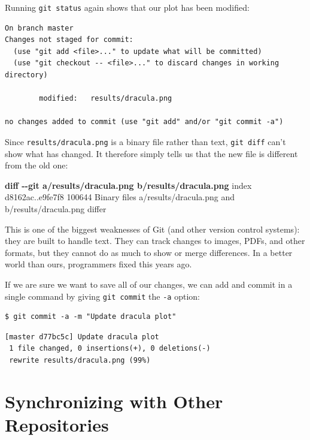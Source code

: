 \documentclass[
]{krantz}
\makeatletter
\newenvironment{Shaded}{\begin{snugshade}}{\end{snugshade}}
\newcommand{\KeywordTok}[1]{\textcolor[rgb]{0.13,0.29,0.53}{\textbf{#1}}}
\newcommand{\NormalTok}[1]{#1}
\newenvironment{kframe}{%
\medskip{}
\setlength{\fboxsep}{.8em}
 \def\at@end@of@kframe{}%
 \ifinner\ifhmode%
  \def\at@end@of@kframe{\end{minipage}}%
  \begin{minipage}{\columnwidth}%
 \fi\fi%
 \def\FrameCommand##1{\hskip\@totalleftmargin \hskip-\fboxsep
 \colorbox{shadecolor}{##1}\hskip-\fboxsep
     \hskip-\linewidth \hskip-\@totalleftmargin \hskip\columnwidth}%
 \MakeFramed {\advance\hsize-\width
   \@totalleftmargin\z@ \linewidth\hsize
   \@setminipage}}%
 {\par\unskip\endMakeFramed%
 \at@end@of@kframe}
\renewenvironment{Shaded}{\begin{kframe}}{\end{kframe}}
\makeatother
\begin{document}
Running \texttt{git\ status} again shows that our plot has been modified:

\begin{verbatim}
On branch master
Changes not staged for commit:
  (use "git add <file>..." to update what will be committed)
  (use "git checkout -- <file>..." to discard changes in working directory)

        modified:   results/dracula.png

no changes added to commit (use "git add" and/or "git commit -a")
\end{verbatim}

Since \texttt{results/dracula.png} is a binary file rather than text,
\texttt{git\ diff} can't show what has changed.
It therefore simply tells us that the new file is different from the old one:

\begin{Shaded}
\begin{Highlighting}[]
\KeywordTok{diff {-}{-}git a/results/dracula.png b/results/dracula.png}
\NormalTok{index d8162ac..e9fe7f8 100644}
\NormalTok{Binary files a/results/dracula.png and b/results/dracula.png differ}
\end{Highlighting}
\end{Shaded}

This is one of the biggest weaknesses of Git
(and other version control systems):
they are built to handle text.
They can track changes to images, PDFs, and other formats,
but they cannot do as much to show or merge differences.
In a better world than ours,
programmers fixed this years ago.

If we are sure we want to save all of our changes,
we can add and commit in a single command
by giving \texttt{git\ commit} the \texttt{-a} option:

\begin{verbatim}
$ git commit -a -m "Update dracula plot"
\end{verbatim}

\begin{verbatim}
[master d77bc5c] Update dracula plot
 1 file changed, 0 insertions(+), 0 deletions(-)
 rewrite results/dracula.png (99%)
\end{verbatim}

\hypertarget{git-cmdline-remotes}{%
\section{Synchronizing with Other Repositories}\label{git-cmdline-remotes}}
\end{document}
